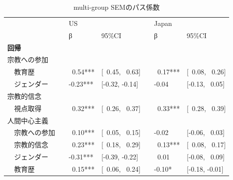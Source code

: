 \documentclass[a4j,12pt]{jreport}
\begin{document}
\begin{table}[H]
{\scriptsize
  \begin{threeparttable}
\caption{multi-group SEMのパス係数}
\label{tab:Table_SEMp}
\begin{tabular}{@{}lllllll@{}}
\toprule
                                    &  & \multicolumn{2}{l}{US}        &  & \multicolumn{2}{l}{Japan}     \\ \cmidrule(lr){3-4} \cmidrule(l){6-7} 
                                    &  & β      & 95\%CI               &  & β      & 95\%CI               \\ \midrule
\textbf{回帰}                          &  &                               &                      &  &                               &                      \\
宗教への参加                &  &                               &                      &  &                               &                      \\
~~教育歴                       &  & ~0.54***                     & {[}~0.45, ~0.63{]} &  & ~0.17***                     & {[}~0.08, ~0.26{]} \\
~~ジェンダー                          &  & -0.23***                      & {[}-0.32, -0.14{]}   &  & -0.04                         & {[}-0.13, ~0.05{]}  \\
宗教的信念                &  &                               &                      &  &                               &                      \\
~~視点取得              &  & ~0.32***                     & {[}~0.26, ~0.37{]} &  & ~0.33***                     & {[}~0.28, ~0.39{]} \\
人間中心主義                    &  &                               &                      &  &                               &                      \\
~~宗教への参加            &  & ~0.10***                     & {[}~0.05, ~0.15{]} &  & -0.02                         & {[}-0.06, ~0.03{]}  \\
~~宗教的信念            &  & ~0.23***                     & {[}~0.18, ~0.29{]} &  & ~0.13***                     & {[}~0.08, ~0.17{]} \\
~~ジェンダー                          &  & -0.31***                      & {[}-0.39, -0.22{]}   &  & ~0.01                        & {[}-0.08, ~0.09{]}  \\
~~教育歴                       &  & ~0.15***                     & {[}~0.06, ~0.24{]} &  & -0.10*  & {[}-0.18, -0.01{]}   \\

\end{tabular}
\end{threeparttable}}
\end{table}
\end{document}
